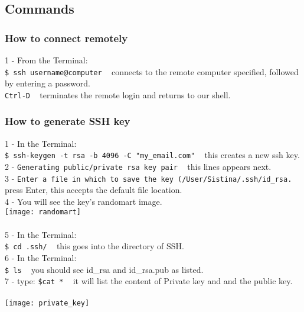 \documentclass{article}
\begin{document}
{{\subsection{Commands}
\subsubsection{How to connect remotely}
1 - From the Terminal:\\
\texttt{\$ ssh username@computer} ~ connects to the remote computer specified, followed by entering a password.\\
\texttt{Ctrl-D} ~ terminates the remote login and returns to our shell. \\
\subsubsection{How to generate SSH key}
1 - In the Terminal:\\
\texttt{\$ ssh-keygen -t rsa -b 4096 -C "my\_email\@address.com"} ~ this creates a new ssh key.\\
2 - \texttt{Generating public/private rsa key pair} ~ this lines appears next. \\
3 - \texttt{Enter a file in which to save the key (/User/Sistina/.ssh/id\_rsa.} ~ press Enter, this accepts the default file location.\\
4 - You will see the key's randomart image. \\
\texttt{[image: randomart]}\\
\\
5 - In the Terminal:\\
\texttt{\$ cd .ssh/} ~ this goes into the directory of SSH.\\
6 - In the Terminal: \\
\texttt{\$ ls} ~ you should see id\_rsa and id\_rsa.pub as listed.\\
7 - type:
\texttt{\$cat *} ~ it will list the content of Private key and and the public key.\\ 
\\
\texttt{[image: private\_key]}\\


\newpage
}}
\end{document}

